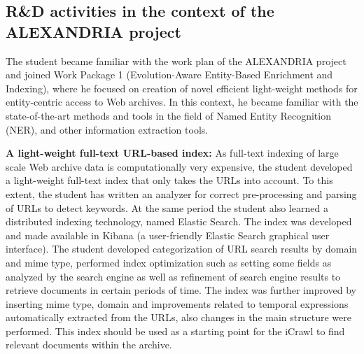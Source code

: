 \documentclass[a4paper,11pt]{report}
\begin{document}
\subsection{R\&D activities in the context of the ALEXANDRIA project}
The student became familiar with the work plan of the ALEXANDRIA project and joined Work Package 
1 (Evolution-Aware Entity-Based Enrichment and Indexing), 
where he focused on creation of novel efficient light-weight methods for 
entity-centric access to Web archives. In this context, he 
became familiar with the state-of-the-art methods and tools in the field of 
Named Entity Recognition (NER), and other information extraction tools. 

\textbf{A light-weight full-text URL-based index:}
As full-text indexing of large scale Web archive data is computationally very expensive,
the student developed a light-weight full-text index that only takes the URLs into account.
To this extent, the student has written an analyzer for correct pre-processing 
and parsing of URLs to detect keywords. 
%
At the same period the student also learned a distributed indexing technology, named Elastic
Search. The index was
developed and made available in Kibana (a user-friendly Elastic Search graphical user
interface). 
%
The student developed categorization of 
URL search results by domain and mime type, performed index optimization such as setting some fields as analyzed 
by the search engine as well as refinement of search engine results to retrieve documents in certain 
periods of time. 
%
The index was further improved by inserting mime type, domain and
improvements related to temporal expressions automatically 
extracted from the URLs, also changes in the main
structure were performed. This index should be used as a starting point for the iCrawl
to find relevant documents within the archive. 
\end{document}
